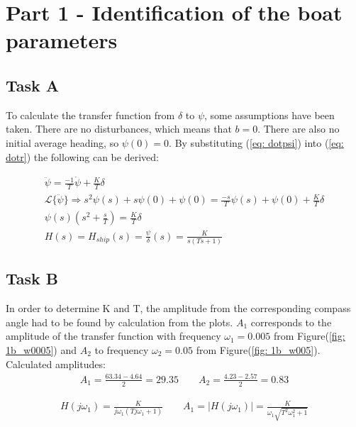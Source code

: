 \section{Part 1 - Identification of the boat parameters}

\subsection{Task A}

To calculate the transfer function from $\delta$ to $\psi$, some assumptions have been taken. There are no disturbances, which means that $b = 0$. There are also no initial average heading, so $\psi(0) = 0$. \newline
By substituting (\ref{eq: dotpsi}) into (\ref{eq: dotr}) the following can be derived:


\begin{align}
    \ddot{\psi} = \frac{-1}{T}\dot{\psi}+\frac{K}{T}\delta  \nonumber    \\
    \mathcal{L}\{\ddot{\psi}\} \Rightarrow s^2\psi(s)+s\psi(0)+\psi(0) = \frac{-s}{T}\psi(s)+\psi(0)+\frac{K}{T}\delta   \nonumber   \\
    \psi(s)(s^2+\frac{s}{T}) = \frac{K}{T}\delta    \nonumber   \\
    H(s) = H_{ship}(s) = \frac{\psi}{\delta}(s) = \frac{K}{s(Ts+1)} \label{eq: deltaToPsi}
\end{align}


\subsection{Task B}
In order to determine K and T, the amplitude from the corresponding compass angle had to be found by calculation from the plots.
$A_1$ corresponds to the amplitude of the transfer function with frequency $\omega_1 = 0.005$ from Figure(\ref{fig: 1b_w0005}) and $A_2$ to frequency $\omega_2 = 0.05$ from Figure(\ref{fig: 1b_w005}).
\\
Calculated amplitudes:
\begin{equation}
    \begin{align}
        A_1 = \frac{63.34 - 4.64}{2} = 29.35 \quad \quad
        A_2 = \frac{4.23 - 2.57}{2} = 0.83 \nonumber
    \end{align}
\end{equation}

\begin{equations}
    \begin{align}
        H(j\omega_1) = \frac{K}{j\omega_1(Tj\omega_1 + 1)} \qquad A_1 = |H(j\omega_1)| = \frac{K}{\omega_1\sqrt{T^2\omega_1^2 + 1}} \nonumber
    \end{align}
\end{equations}

